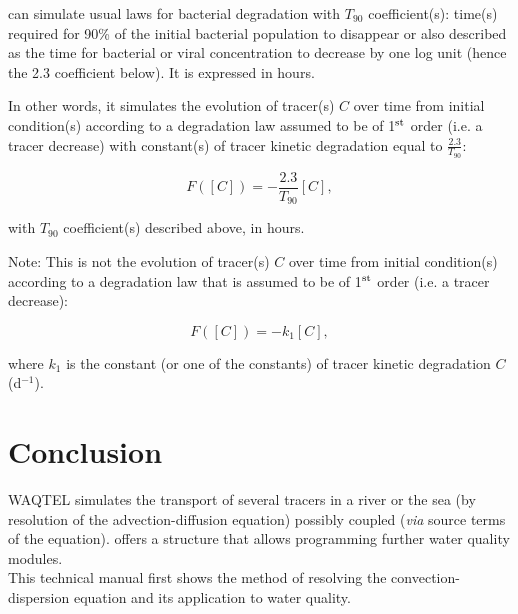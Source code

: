 \documentclass[Waqtel]{../../data/TelemacDoc} %
\begin{document}

\waqtel can simulate usual laws for bacterial degradation with
$T_{90}$ coefficient(s):
time(s) required for 90\% of the initial bacterial population to disappear
or also described as the time for bacterial or viral concentration to decrease
by one log unit (hence the 2.3 coefficient below).
It is expressed in hours.

In other words, it simulates the evolution of tracer(s) $C$ over time from
initial condition(s) according to a degradation law assumed to be of
1$^{\rm{st}}$ order (i.e. a tracer decrease) with constant(s) of tracer kinetic
degradation equal to $\frac{2.3}{T_{90}}$:

\begin{equation}
  F([C]) = -\frac{2.3}{T_{90}} [C],
\end{equation}

with $T_{90}$ coefficient(s) described above, in hours.
\\

\begin{WarningBlock}{Note:}
This is not the evolution of tracer(s) $C$ over time from initial condition(s) 
according to a degradation law that is assumed to be of 1$^{\rm{st}}$ order
(i.e. a tracer decrease):

\begin{equation}
  F([C]) = -k_1 [C],
\end{equation}

where $k_1$ is the constant (or one of the constants) of tracer kinetic
degradation $C$ (d$^{-1}$).
\end{WarningBlock}


\chapter{Conclusion}

WAQTEL simulates the transport of several tracers in a river or the sea
(by resolution of the advection-diffusion equation) possibly coupled
(\textit{via} source terms of the equation).
\waqtel offers a structure that allows programming further water quality modules.\\

This technical manual first shows the method of resolving the convection-dispersion equation
and its application to water quality.\\
\end{document}

